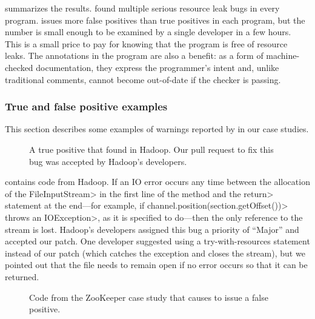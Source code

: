  summarizes the results. \Tool found multiple
serious resource leak bugs in every program. \Tool issues
more false positives than true positives in each program, but
the number is small enough to be examined by a single developer in a
few hours.  This is a small price to pay for knowing that the program is
free of resource leaks.  The annotations in the program are
also a benefit: as a form of machine-checked documentation, they
express the programmer's intent and, unlike traditional comments,
cannot become out-of-date if the checker is passing.

\subsubsection{True and false positive examples}
\label{sec:examples}

This section describes some examples of warnings reported by \Tool
in our case studies.

\begin{figure}
  
  \prefigcaption
  \caption{A true positive that \Tool found in Hadoop. Our pull request
    to fix this bug was accepted by Hadoop's developers.}
  \label{fig:hadoop-bug}
\end{figure}

 contains code from Hadoop. If an IO error
occurs any time between the allocation of the \<FileInputStream>
in the first line of the method and the \<return> statement
at the end---for example, if \<channel.position(section.getOffset())>
throws an \<IOException>, as it is specified to do---then the
only reference to the stream is lost. Hadoop's developers
assigned this bug a priority of ``Major'' and accepted our
patch.
One developer suggested using a try-with-resources statement instead
of our patch (which catches the exception and closes the stream),
but we pointed out that
the file needs to remain open if no error occurs so that it can be
returned.  

\begin{figure}
  
  \prefigcaption
  \caption{Code from the ZooKeeper case study that causes \Tool
  to issue a false positive.}
  \label{fig:zookeeper-optional}
\end{figure}

